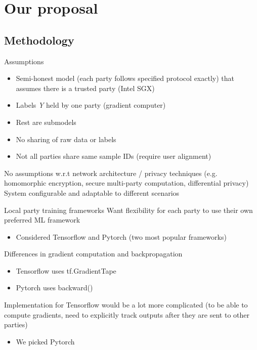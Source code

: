 \documentclass[xcolor=dvipsnames]{beamer}
\begin{document}
\section{Our proposal}
\subsection{Methodology}
\begin{frame}{Assumptions}
  \begin{itemize}
      \item Semi-honest model (each party follows specified protocol exactly) that assumes there is a trusted party (Intel SGX)
      \item Labels {\it{Y}} held by one party (gradient computer)
      \item Rest are submodels
      \item No sharing of raw data or labels 
      \item Not all parties share same sample IDs (require user alignment)
  \end{itemize}
  No assumptions w.r.t network architecture / privacy techniques (e.g. homomorphic encryption, secure multi-party computation, differential privacy)\\
  System configurable and adaptable to different scenarios
\end{frame}

\begin{frame}{Local party training frameworks}
    Want flexibility for each party to use their own preferred ML framework
    \begin{itemize}
        \item Considered Tensorflow and Pytorch (two most popular frameworks)
    \end{itemize}
    Differences in gradient computation and backpropagation
    \begin{itemize}
        \item Tensorflow uses tf.GradientTape
        \item Pytorch uses backward()
    \end{itemize}
    Implementation for Tensorflow would be a lot more complicated (to be able to compute gradients, need to explicitly track outputs after they are sent to other parties)
    \begin{itemize}
        \item We picked Pytorch
    \end{itemize}
\end{frame}
\end{document}
